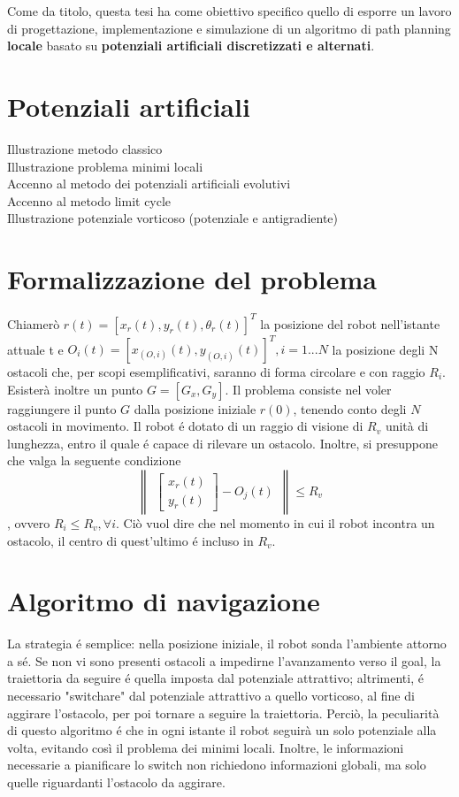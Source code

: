 \documentclass[14pt,twoside,a4paper]{extarticle}
\begin{document}
Come da titolo, questa tesi ha come obiettivo specifico quello di esporre un lavoro di progettazione, implementazione e simulazione di un algoritmo di path planning \textbf{locale} basato su \textbf{potenziali artificiali discretizzati e alternati}. 

\section{Potenziali artificiali}
Illustrazione metodo classico\\
Illustrazione problema minimi locali\\
Accenno al metodo dei potenziali artificiali evolutivi\\
Accenno al metodo limit cycle\\
Illustrazione potenziale vorticoso (potenziale e antigradiente)

\section{Formalizzazione del problema\cite{dalfonso}}
Chiamerò \( r(t) = [x_r(t),y_r(t),\theta_r(t)]^T\) la posizione del robot nell'istante attuale t e \( O_i(t) = [x_(O,i)(t),y_(O,i)(t)]^T, i = 1...N\) la posizione degli N ostacoli che, per scopi esemplificativi, saranno di forma circolare e con raggio \(R_i\). Esisterà inoltre un punto \(G = [G_x, G_y]\). Il problema consiste nel voler raggiungere il punto \(G\) dalla posizione iniziale \(r(0)\), tenendo conto degli \(N\) ostacoli in movimento. Il robot é dotato di un raggio di visione di \(R_v\) unità di lunghezza, entro il quale é capace di rilevare un ostacolo. Inoltre, si presuppone che valga la seguente condizione
\[\begin{Vmatrix}\begin{bmatrix} x_r(t)\\ y_r(t) \end{bmatrix} - O_j(t)\end{Vmatrix} \leq R_v \], ovvero \( R_i \leq R_v, \forall i\). Ciò vuol dire che nel momento in cui il robot incontra un ostacolo, il centro di quest'ultimo é incluso in \(R_v\).

\section{Algoritmo di navigazione\cite{dalfonso}} 
La strategia é semplice: nella posizione iniziale, il robot sonda l'ambiente attorno a sé. Se non vi sono presenti ostacoli a impedirne l'avanzamento verso il goal, la traiettoria da seguire é quella imposta dal potenziale attrattivo; altrimenti, é necessario "switchare" dal potenziale attrattivo a quello vorticoso, al fine di aggirare l'ostacolo, per poi tornare a seguire la traiettoria. Perciò, la peculiarità di questo algoritmo é che in ogni istante il robot seguirà un solo potenziale alla volta, evitando così il problema dei minimi locali. Inoltre, le informazioni necessarie a pianificare lo switch non richiedono informazioni globali, ma solo quelle riguardanti l'ostacolo da aggirare.
\end{document}
